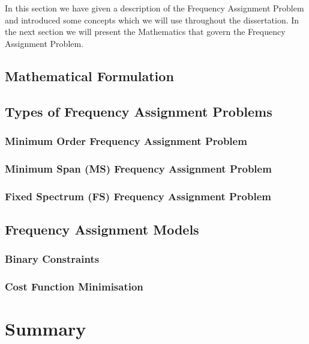 In this section we have given a description of the Frequency Assignment Problem and introduced some concepts which we will use throughout the dissertation. In the next section we will present the 
Mathematics that govern the Frequency Assignment Problem.
\subsection{Mathematical Formulation}
\subsection{Types of Frequency Assignment Problems}
\subsubsection{Minimum Order Frequency Assignment Problem}
\subsubsection{Minimum Span (MS) Frequency Assignment Problem}
\subsubsection{Fixed Spectrum (FS) Frequency Assignment Problem}
\subsection{Frequency Assignment Models}
\subsubsection{Binary Constraints}
\subsubsection{Cost Function Minimisation}
\section{Summary}
